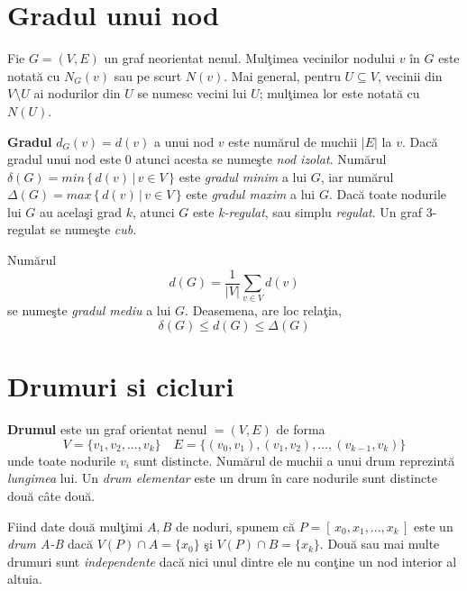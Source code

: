 \documentclass[11pt,a4paper]{report}
\begin{document}
    \section{Gradul unui nod}
    
    
    Fie $G=(V,E)$ un graf neorientat nenul. Mul\c timea vecinilor nodului  $v$ \^ in $G$ este notat\u a cu $N_G(v)$ sau pe scurt $N(v)$. Mai general, pentru $U\subseteq V$, vecinii din $V\setminus U$ ai nodurilor din $U$ se numesc vecini lui $U$; mul\c timea lor este notat\u a cu $N(U)$.
    
    \textbf{Gradul} $d_G(v)=d(v)$ a unui nod $v$  este num\u arul de muchii $|E|$ la $v$. Dac\u a gradul unui nod este $0$ atunci acesta se nume\c ste \textit{nod izolat}. Num\u arul $\delta(G)=min\, \{\,d(v)\, |\, v\in V\, \}$ este \textit{gradul minim} \cite{Bondy} a lui $G$, iar num\u arul $\Delta(G)=max\, \{\, d(v)\, |\, v\in V\,\}$ este \textit{gradul maxim} \cite{Bondy} a lui $G$. Dac\u a toate nodurile lui $G$ au acela\c si grad $k$, atunci $G$ este \textit{k-regulat}, sau simplu \textit{regulat}. Un graf 3-regulat se nume\c ste \textit{cub}.
    
    Num\u arul
        \begin{equation*}
    d(G)=\frac{1}{|V|} \sum\limits_{v\in V} d(v)
    \end{equation*}
    se nume\c ste \textit{gradul mediu } \cite{Bondy} a lui $G$. Deasemena, are loc rela\c tia,
    \begin{equation*}
    \delta(G)\le d(G)\le \Delta(G)
    \end{equation*}
    
    
    
    \section{Drumuri si cicluri}
    \textbf{Drumul} este un graf orientat nenul $=(V,E)$ de forma 
    \begin{equation*}
    V=\{v_1,v_2,...,v_k\}\quad E=\{(v_0,v_1),(v_1,v_2),...,(v_{k-1},v_k)\}
    \end{equation*}
    unde toate nodurile $v_i$ sunt distincte. Num\u arul de muchii a unui drum reprezint\u a \textit{lungimea } lui. Un \textit{drum elementar} este un drum \^ in care nodurile sunt distincte dou\u a c\^ ate dou\u a.
    
    Fiind date dou\u a mul\c timi $A,B$ de noduri, spunem c\u a $P=[\,x_0,x_1,...,x_k\,]$ este un \textit{drum A-B} dac\u a $V(P)\cap A=\{x_0\}$ \c si $V(P)\cap B=\{x_k\}$. Dou\u a sau mai multe drumuri sunt \textit{independente} dac\u a nici unul dintre ele nu con\c tine un nod interior al altuia.
    
\end{document}
